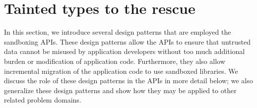 \section{Tainted types to the rescue}
\label{sec:tainted}
%
In this section, we introduce several design patterns that are employed the 
\sys sandboxing APIs.
%
These design patterns allow the \sys APIs to ensure that untrusted data cannot 
be misused by application developers without too much additional burden or 
modification of application code.
%
Furthermore, they also allow incremental migration of the application code to 
use sandboxed libraries. 
%
We discuss the role of these design patterns in the \sys APIs in more detail 
below; we also generalize these design patterns and show how they may be 
applied to other related problem domains.






